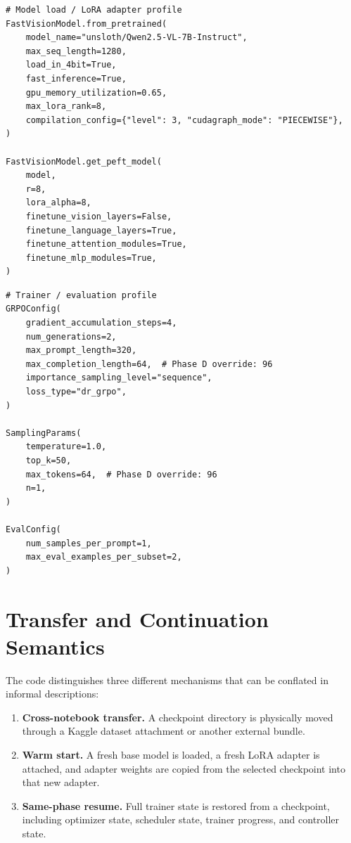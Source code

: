\documentclass{article} %
\begin{document}
\begin{Verbatim}[fontsize=\scriptsize,frame=single,framesep=3mm]
# Model load / LoRA adapter profile
FastVisionModel.from_pretrained(
    model_name="unsloth/Qwen2.5-VL-7B-Instruct",
    max_seq_length=1280,
    load_in_4bit=True,
    fast_inference=True,
    gpu_memory_utilization=0.65,
    max_lora_rank=8,
    compilation_config={"level": 3, "cudagraph_mode": "PIECEWISE"},
)

FastVisionModel.get_peft_model(
    model,
    r=8,
    lora_alpha=8,
    finetune_vision_layers=False,
    finetune_language_layers=True,
    finetune_attention_modules=True,
    finetune_mlp_modules=True,
)
\end{Verbatim}

\begin{Verbatim}[fontsize=\scriptsize,frame=single,framesep=3mm]
# Trainer / evaluation profile
GRPOConfig(
    gradient_accumulation_steps=4,
    num_generations=2,
    max_prompt_length=320,
    max_completion_length=64,  # Phase D override: 96
    importance_sampling_level="sequence",
    loss_type="dr_grpo",
)

SamplingParams(
    temperature=1.0,
    top_k=50,
    max_tokens=64,  # Phase D override: 96
    n=1,
)

EvalConfig(
    num_samples_per_prompt=1,
    max_eval_examples_per_subset=2,
)
\end{Verbatim}

\section{Transfer and Continuation Semantics}

The code distinguishes three different mechanisms that can be conflated in informal descriptions:
\begin{enumerate}[leftmargin=1.2em]
\item \textbf{Cross-notebook transfer.} A checkpoint directory is physically moved through a Kaggle dataset attachment or another external bundle.
\item \textbf{Warm start.} A fresh base model is loaded, a fresh LoRA adapter is attached, and adapter weights are copied from the selected checkpoint into that new adapter.
\item \textbf{Same-phase resume.} Full trainer state is restored from a checkpoint, including optimizer state, scheduler state, trainer progress, and controller state.
\end{enumerate}
\end{document}
